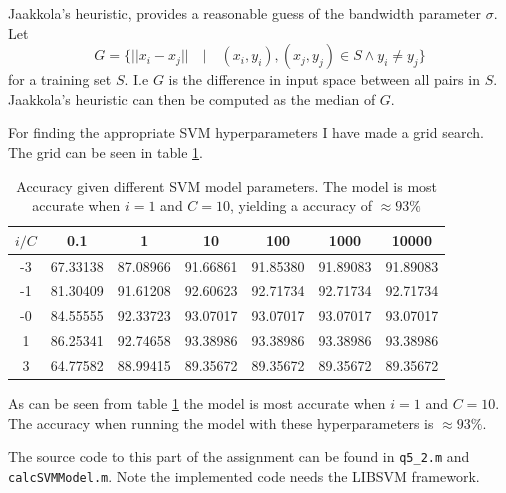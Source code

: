 \documentclass[10pt]{article}
\begin{document}
Jaakkola's heuristic, provides a reasonable guess of the bandwidth parameter $\sigma$\cite{assignment3}. Let 
\begin{equation}
  G = \{ ||x_i - x_j||\quad | \quad (x_i,y_i),(x_j,y_j) \in S \wedge y_i \neq y_j \}
\end{equation}
for a training set $S$. I.e $G$ is the difference in input space between all pairs in $S$. Jaakkola's heuristic can then be computed as the median of $G$. 

For finding the appropriate SVM hyperparameters I have made a grid search. The grid can be seen in table \ref{table4}.  

\begin{table}
  \begin{center}  
    \begin{tabular}{ | c | c | c | c | c | c | c |}
      \hline
       $i/C$   & 0.1          & 1             & 10           & 100           & 1000          &     10000\\ \hline
       -3 & 67.33138     & 87.08966      & 91.66861     & 91.85380      & 91.89083      &     91.89083\\ \hline
       -1 & 81.30409     & 91.61208      & 92.60623     & 92.71734      & 92.71734      &     92.71734\\ \hline            
       -0 & 84.55555     & 92.33723      & 93.07017     & 93.07017      & 93.07017      &     93.07017\\ \hline      
       1  & 86.25341     & 92.74658      & 93.38986     & 93.38986      & 93.38986      &     93.38986\\ \hline      
       3  & 64.77582     & 88.99415      & 89.35672     & 89.35672      & 89.35672      &     89.35672\\ \hline      
    \end{tabular}
    \caption{Accuracy given different SVM model parameters. The model is most accurate when $i=1$ and $C=10$, yielding a accuracy of $\approx 93\%$}
    \label{table4}
  \end{center}    
\end{table}   
As can be seen from table \ref{table4} the model is most accurate when $i=1$ and $C=10$. The accuracy when running the model with these hyperparameters is $\approx 93\%$.

The source code to this part of the assignment can be found in \texttt{q5\_2.m} and \texttt{calcSVMModel.m}. Note the implemented code needs the LIBSVM framework\cite{libsvm}. 
\end{document}
